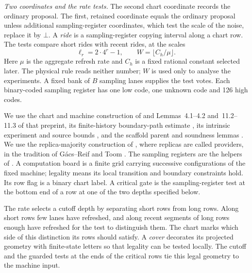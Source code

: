 \emph{Two coordinates and the rate tests.} The second chart coordinate records the ordinary proposal. The first, retained coordinate equals the ordinary proposal unless additional sampling-register coordinates, which test the scale of the noise, replace it by \(\bot\). A \emph{ride} is a sampling-register copying interval along a chart row. The tests compare short rides with recent rides, at the scales
\begin{equation}\label{eq:c-scales}
 \ell_r=2\cdot4^r-1,\qquad W=\lfloor C_h/\mu\rfloor.
\end{equation}
Here \(\mu\) is the aggregate refresh rate and \(C_h\) is a fixed rational constant selected later. The physical rule reads neither number; \(W\) is used only to analyse the experiments. A fixed bank of \(B\) sampling lanes supplies the test votes. Each binary-coded sampling register has one low code, one unknown code and 126 high codes.

We use the chart and machine construction of \mbox{\cite[Proposition~4.3]{DMNoise2026}} and Lemmas~4.1\nobreakdash--4.2 and~11.2\nobreakdash--11.3 of that preprint, its
finite-history boundary-path estimate
\mbox{\cite[Lemma~11.6]{DMNoise2026}}, its intrinsic experiment and source bounds
\cite[Lemmas~6.1--6.3 and~10.4]{DMNoise2026}, and the scaffold parent and
soundness lemmas \cite[Lemmas~A.3 and~A.2]{DMPhase2026}. We use the replica-majority construction of \cite[Theorem~2.1]{DMFixed2026}, where replicas are called providers, in the tradition of G\'acs--Reif and Toom \cite{GacsReif1988,Toom1980}. The sampling registers are the helpers of \cite{DMNoise2026}. A computation board
is a finite grid carrying successive configurations of the fixed machine;
legality means its local transition and boundary constraints hold. Its
row flag is a binary chart label. A critical gate is the sampling-register test at
the bottom end of a row at one of the two depths specified below.

The rate selects a cutoff depth by separating short rows from long rows. Along short rows few lanes have refreshed, and along recent segments of long rows enough have refreshed for the test to distinguish them. The chart marks which side of this distinction its rows should satisfy. A \emph{cover} decorates its projected geometry with finite-state letters so that legality can be tested locally. The cutoff and the guarded tests at the ends of the critical rows tie this legal geometry to the machine input.

